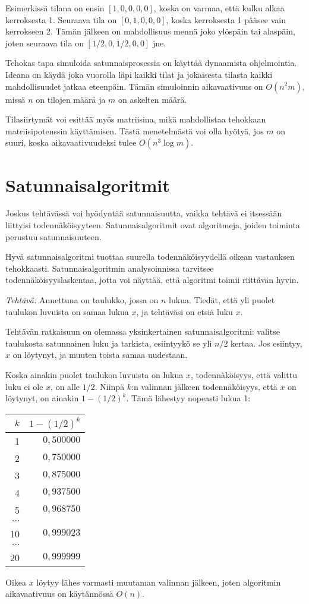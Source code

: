 Esimerkissä tilana on ensin $[1,0,0,0,0]$,
koska on varmaa, että kulku alkaa kerroksesta 1.
Seuraava tila on $[0,1,0,0,0]$,
koska kerroksesta 1 pääsee vain kerrokseen 2.
Tämän jälkeen on mahdollisuus mennä joko ylöspäin
tai alaspäin, joten seuraava tila on $[1/2,0,1/2,0,0]$ jne.

Tehokas tapa simuloida satunnaisprosessia on käyttää dynaamista
ohjelmointia.
Ideana on käydä joka vuorolla läpi kaikki tilat
ja jokaisesta tilasta kaikki mahdollisuudet jatkaa eteenpäin.
Tämän simuloinnin aikavaativuus on $O(n^2 m)$,
missä $n$ on tilojen määrä ja $m$ on askelten määrä.

Tilasiirtymät voi esittää myös matriisina,
mikä mahdollistaa tehokkaan matriisipotenssin käyttämisen.
Tästä menetelmästä voi olla hyötyä, jos $m$ on suuri,
koska aikavaativuudeksi tulee $O(n^3 \log m)$.

\section{Satunnaisalgoritmit}

Joskus tehtävässä voi hyödyntää satunnaisuutta,
vaikka tehtävä ei itsessään liittyisi todennäköisyyteen.
Satunnaisalgoritmit ovat algoritmeja, joiden toiminta
perustuu satunnaisuuteen.

Hyvä satunnaisalgoritmi tuottaa suurella todennäköisyydellä
oikean vastauksen tehokkaasti.
Satunnaisalgoritmin analysoinnissa tarvitsee
todennäköisyyslaskentaa, jotta voi näyttää,
että algoritmi toimii riittävän hyvin.

\textit{Tehtävä:} Annettuna on taulukko, jossa on $n$ lukua.
Tiedät, että yli puolet taulukon luvuista on samaa lukua $x$,
ja tehtäväsi on etsiä luku $x$.

Tehtävän ratkaisuun on olemassa yksinkertainen
satunnaisalgoritmi: valitse taulukosta satunnainen luku
ja tarkista, esiintyykö se yli $n/2$ kertaa.
Jos esiintyy, $x$ on löytynyt, ja muuten toista samaa uudestaan.

Koska ainakin puolet taulukon luvuista on lukua $x$,
todennäköisyys, että valittu luku ei ole $x$, on alle $1/2$.
Niinpä $k$:n valinnan jälkeen todennäköisyys,
että $x$ on löytynyt, on ainakin $1-(1/2)^k$.
Tämä lähestyy nopeasti lukua 1:

\begin{center}
\begin{tabular}{rr}
$k$ & \phantom{XXXXX} $1-(1/2)^k$ \\
\hline
1 & $0{,}500000$ \\
2 & $0{,}750000$ \\
3 & $0{,}875000$ \\
4 & $0{,}937500$ \\
5 & $0{,}968750$ \\
$\cdots$ \\
10 & $0{,}999023$ \\
$\cdots$ \\
20 & $0{,}999999$ \\
\end{tabular}
\end{center}

Oikea $x$ löytyy lähes varmasti muutaman valinnan jälkeen,
joten algoritmin aikavaativuus on käytännössä $O(n)$.

